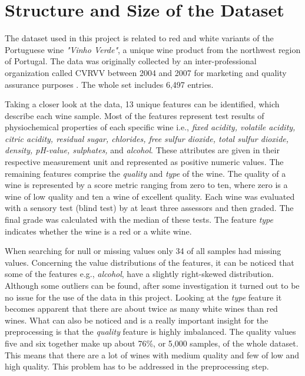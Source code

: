 \section{Structure and Size of the Dataset}\label{sec:data_structure}


The dataset used in this project is related to red and white variants of the Portuguese wine \textit{"Vinho Verde"}, a unique wine product from the northwest region of Portugal. The data was originally collected by an inter-professional organization called CVRVV between 2004 and 2007 for marketing and quality assurance purposes \citep{misc_wine_quality_186}. The whole set includes 6,497 entries.

Taking a closer look at the data, 13 unique features can be identified, which describe each wine sample. Most of the features represent test results of physiochemical properties of each specific wine i.e., \textit{fixed acidity, volatile acidity, citric acidity, residual sugar, chlorides, free sulfur dioxide, total sulfur dioxide, density, pH-value, sulphates,}  and \textit{alcohol}. These attributes are given in their respective measurement unit and represented as positive numeric values. The remaining features comprise the \textit{quality} and \textit{type} of the wine. The quality of a wine is represented by a score metric ranging from zero to ten, where zero is a wine of low quality and ten a wine of excellent quality. Each wine was evaluated with a sensory test (blind test) by at least three assessors and then graded. The final grade was calculated with the median of these tests. The feature \textit{type} indicates whether the wine is a red or a white wine.

When searching for null or missing values only 34 of all samples had missing values. Concerning the value distributions of the features, it can be noticed that some of the features e.g., \textit{alcohol}, have a slightly right-skewed distribution. Although some outliers can be found, after some investigation it turned out to be no issue for the use of the data in this project. Looking at the \textit{type} feature it becomes apparent that there are about twice as many white wines than red wines. What can also be noticed and is a really important insight for the preprocessing is that the \textit{quality} feature is highly imbalanced. The quality values five and six together make up about 76\%, or 5,000 samples, of the whole dataset. This means that there are a lot of wines with medium quality and few of low and high quality. This problem has to be addressed in the preprocessing step.
\pagebreak